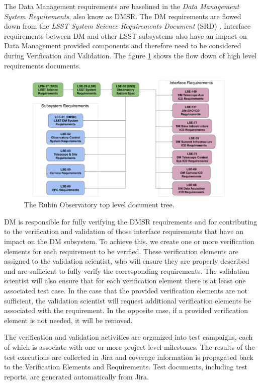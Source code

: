 The Data Management requirements are baselined in the \textit{Data Management System Requirements}\cite{LSE-61}, also know as DMSR.
The DM requirements are flowed down from the \textit{LSST System Science Requirements Document} (SRD) \cite{LPM-17}.
Interface requirements between DM and other LSST subsystems also have an impact on Data Management provided components
and therefore need to be considered during Verification and Validation.
The figure \ref{fig:topdoctree} shows the flow down of high level requirements documents.

\begin{figure}
\begin{center}
\includegraphics[width=\textwidth]{imgs/TopLevelDocTree.png}
 \caption{The Rubin Observatory top level document tree.}
 \label{fig:topdoctree}
\end{center}
\end{figure}

DM is responsible for fully verifying the DMSR requirements and for contributing to the verification and validation of those interface requirements that have an impact on the DM subsystem.
To achieve this, we create one or more verification elements for each requirement to be verified.
These verification elements are assigned to the validation scientist,
who will ensure they are properly described and are sufficient to fully verify the corresponding requirements.
The validation scientist will also ensure that for each verification element there is at least one associated test case.
In the case that the provided verification elements are not sufficient, the validation scientist will request additional verification elements be associated with the requirement.
In the opposite case, if a provided verification element is not needed, it will be removed.

The verification and validation activities are organized into test campaigns, each of which is associate with one or more project level milestones.
The results of the test executions are collected in Jira and coverage information is propagated back to the Verification Elements and Requirements.
Test documents, including test reports, are generated automatically from Jira.

